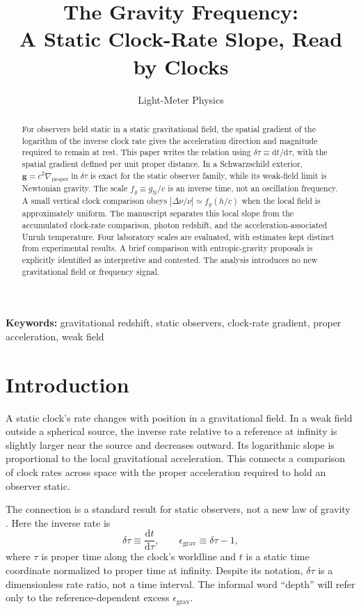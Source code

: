 \documentclass[12pt]{article}
\title{The Gravity Frequency:\\
A Static Clock-Rate Slope, Read by Clocks}
\author{Light-Meter Physics}
\date{}
\begin{document}
\maketitle

\begin{abstract}
For observers held static in a static gravitational field, the spatial gradient of the logarithm of the inverse clock rate gives the acceleration direction and magnitude required to remain at rest. This paper writes the relation using $\delta\tau\equiv\mathrm{d}t/\mathrm{d}\tau$, with the spatial gradient defined per unit proper distance. In a Schwarzschild exterior, $\mathbf{g}=c^2\nabla_{\mathrm{proper}}\ln\delta\tau$ is exact for the static observer family, while its weak-field limit is Newtonian gravity. The scale $f_g\equiv g_{\mathrm{N}}/c$ is an inverse time, not an oscillation frequency. A small vertical clock comparison obeys $|\Delta\nu/\nu|\simeq f_g(h/c)$ when the local field is approximately uniform. The manuscript separates this local slope from the accumulated clock-rate comparison, photon redshift, and the acceleration-associated Unruh temperature. Four laboratory scales are evaluated, with estimates kept distinct from experimental results. A brief comparison with entropic-gravity proposals is explicitly identified as interpretive and contested. The analysis introduces no new gravitational field or frequency signal.
\end{abstract}

\noindent\textbf{Keywords:} gravitational redshift, static observers, clock-rate gradient, proper acceleration, weak field

\section{Introduction}

A static clock's rate changes with position in a gravitational field. In a weak field outside a spherical source, the inverse rate relative to a reference at infinity is slightly larger near the source and decreases outward. Its logarithmic slope is proportional to the local gravitational acceleration. This connects a comparison of clock rates across space with the proper acceleration required to hold an observer static.

The connection is a standard result for static observers, not a new law of gravity \cite{SantiagoVisser,Schwarzschild}. Here the inverse rate is
\begin{equation}
  \delta\tau\equiv\frac{\mathrm{d}t}{\mathrm{d}\tau},
  \qquad
  \epsilon_{\mathrm{grav}}\equiv\delta\tau-1,
  \label{eq:inverse-rate}
\end{equation}
where $\tau$ is proper time along the clock's worldline and $t$ is a static time coordinate normalized to proper time at infinity. Despite its notation, $\delta\tau$ is a dimensionless rate ratio, not a time interval. The informal word ``depth'' will refer only to the reference-dependent excess $\epsilon_{\mathrm{grav}}$.
\end{document}
